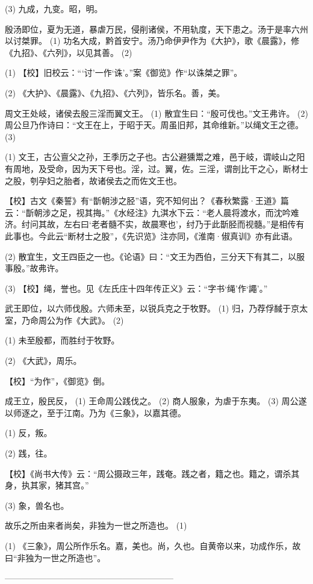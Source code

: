 \documentclass[12pt,UTF8]{ctexbook}
\begin{document}
(3) 九成，九变。昭，明。

殷汤即位，夏为无道，暴虐万民，侵削诸侯，不用轨度，天下患之。汤于是率六州以讨桀罪。 (1) 功名大成，黔首安宁。汤乃命伊尹作为《大护》，歌《晨露》，修《九招》、《六列》，以见其善。 (2)

(1) 【校】旧校云：“‘讨’一作‘诛’。”案《御览》作“以诛桀之罪”。

(2) 《大护》、《晨露》、《九招》、《六列》，皆乐名。善，美。

周文王处岐，诸侯去殷三淫而翼文王。 (1) 散宜生曰：“殷可伐也。”文王弗许。 (2) 周公旦乃作诗曰：“文王在上，于昭于天。周虽旧邦，其命维新。”以绳文王之德。 (3)

(1) 文王，古公亶父之孙，王季历之子也。古公避獯鬻之难，邑于岐，谓岐山之阳有周地，及受命，因为天下号也。淫，过。翼，佐。三淫，谓剖比干之心，断材士之股，刳孕妇之胎者，故诸侯去之而佐文王也。

【校】古文《秦誓》有“斮朝涉之胫”语，究不知何出？《春秋繁露·王道》篇云：“斮朝涉之足，视其挴。”《水经注》九淇水下云：“老人晨将渡水，而沈吟难济。纣问其故，左右曰‘老者髓不实，故晨寒也’，纣乃于此斮胫而视髓。”是相传有此事也。今此云“断材士之股”，《先识览》注亦同，《淮南·俶真训》亦有此语。

(2) 散宜生，文王四臣之一也。《论语》曰：“文王为西伯，三分天下有其二，以服事殷。”故弗许。

(3) 【校】绳，誉也。见《左氏庄十四年传正义》云：“字书‘绳’作‘譝’。”

武王即位，以六师伐殷。六师未至，以锐兵克之于牧野。 (1) 归，乃荐俘馘于京太室，乃命周公为作《大武》。 (2)

(1) 未至殷都，而胜纣于牧野。

(2) 《大武》，周乐。

【校】“为作”，《御览》倒。

成王立，殷民反， (1) 王命周公践伐之。 (2) 商人服象，为虐于东夷。 (3) 周公遂以师逐之，至于江南。乃为《三象》，以嘉其德。

(1) 反，叛。

(2) 践，往。

【校】《尚书大传》云：“周公摄政三年，践奄。践之者，籍之也。籍之，谓杀其身，执其家，猪其宫。”

(3) 象，兽名也。

故乐之所由来者尚矣，非独为一世之所造也。 (1)

(1) 《三象》，周公所作乐名。嘉，美也。尚，久也。自黄帝以来，功成作乐，故曰“非独为一世之所造也”。




————————————————————
\end{document}
